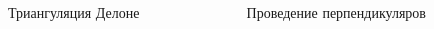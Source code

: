 \documentclass[pdf,hyperref={unicode}]{beamer}
\begin{document}
\begin{frame}
\begin{columns}
{
\begin{column}{0.3\linewidth}
\begin{figure}[h]
\caption{\tiny Триангуляция Делоне}
\end{figure}
\end{column}
}

{
\begin{column}{0.3\linewidth}
\begin{figure}[h]
\caption{\tiny Проведение перпендикуляров}
\end{figure}
\end{column}
}


\end{columns}
\end{frame}
\end{document}
